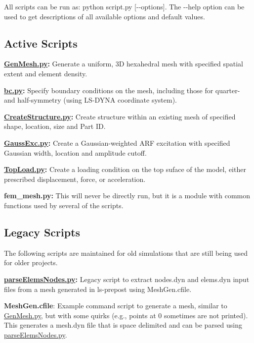 All scripts can be run as\+: {\ttfamily python script.\+py \mbox{[}-\/-\/options\mbox{]}}. The {\ttfamily -\/-\/help} option can be used to get descriptions of all available options and default values.

\subsection*{Active Scripts }


\begin{DoxyItemize}
\item {\bfseries \hyperlink{GenMesh_8py}{Gen\+Mesh.\+py}\+:} Generate a uniform, 3\+D hexahedral mesh with specified spatial extent and element density.
\item {\bfseries \hyperlink{bc_8py}{bc.\+py}\+:} Specify boundary conditions on the mesh, including those for quarter-\/ and half-\/symmetry (using L\+S-\/\+D\+Y\+N\+A coordinate system).
\item {\bfseries \hyperlink{CreateStructure_8py}{Create\+Structure.\+py}\+:} Create structure within an existing mesh of specified shape, location, size and Part I\+D.
\item {\bfseries \hyperlink{GaussExc_8py}{Gauss\+Exc.\+py}\+:} Create a Gaussian-\/weighted A\+R\+F excitation with specified Gaussian width, location and amplitude cutoff.
\item {\bfseries \hyperlink{TopLoad_8py}{Top\+Load.\+py}\+:} Create a loading condition on the top suface of the model, either prescribed displacement, force, or acceleration.
\item {\bfseries fem\+\_\+mesh.\+py\+:} This will never be directly run, but it is a module with common functions used by several of the scripts.
\end{DoxyItemize}

\subsection*{Legacy Scripts }

The following scripts are maintained for old simulations that are still being used for older projects.


\begin{DoxyItemize}
\item {\bfseries \hyperlink{parseElemsNodes_8py}{parse\+Elems\+Nodes.\+py}\+:} Legacy script to extract {\ttfamily nodes.\+dyn} and {\ttfamily elems.\+dyn} input files from a mesh generated in ls-\/prepost using {\ttfamily Mesh\+Gen.\+cfile}.
\item {\bfseries Mesh\+Gen.\+cfile}\+: Example command script to generate a mesh, similar to {\ttfamily \hyperlink{GenMesh_8py}{Gen\+Mesh.\+py}}, but with some quirks (e.\+g., points at 0 sometimes are not printed). This generates a {\ttfamily mesh.\+dyn} file that is space delimited and can be parsed using {\ttfamily \hyperlink{parseElemsNodes_8py}{parse\+Elems\+Nodes.\+py}}. 
\end{DoxyItemize}